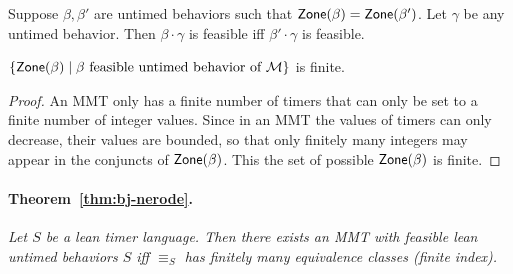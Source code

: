 \begin{lemma}
\label{lemma: feasibility concatenation}
Suppose $\beta, \beta'$ are untimed behaviors such that
$\mathsf{Zone}({\beta}) = \mathsf{Zone}({\beta'})$. Let $\gamma$ be any untimed behavior.
Then $\beta \cdot \gamma$ is feasible iff $\beta' \cdot \gamma$ is feasible.
\end{lemma}

\begin{lemma}
\label{lemma finitely many zones}
$\{ \mathsf{Zone}({\beta}) \mid \beta \mbox{ feasible untimed behavior of } {\mathcal M} \}$ is finite.
\end{lemma}
\begin{proof}
  An MMT only has a finite number of timers that can only be set to a finite number of integer values. Since in an MMT the values of timers can only decrease, their values are bounded, so that only finitely many integers may appear in the conjuncts of $\mathsf{Zone}({\beta})$. This the set of possible $\mathsf{Zone}({\beta})$ is finite.
\end{proof}

\paragraph{Theorem~\ref{thm:bj-nerode}.}
\emph{Let $S$ be a lean timer language.
Then there exists an MMT with feasible lean untimed behaviors $S$ iff
$\equiv_S$ has finitely many equivalence classes (finite index).}

